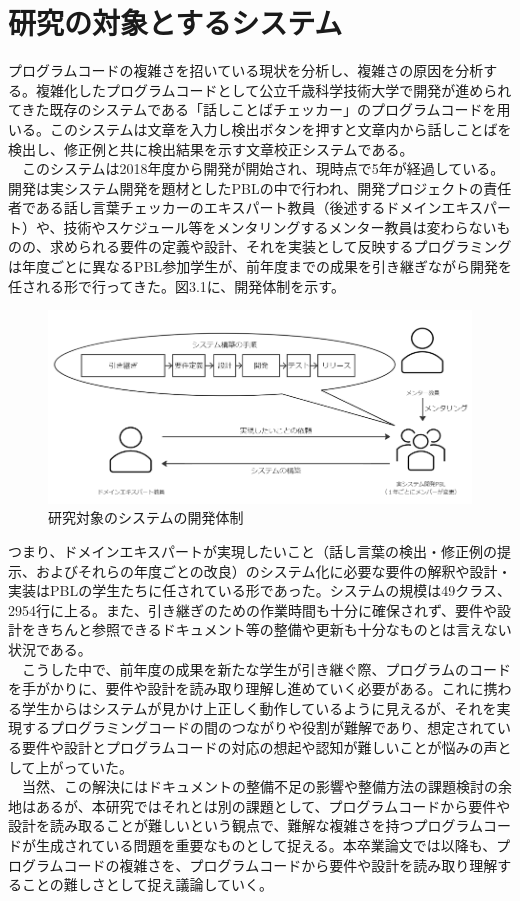 \documentclass[12pt, a4paper]{jreport}
\begin{document}
\section{研究の対象とするシステム}
プログラムコードの複雑さを招いている現状を分析し、複雑さの原因を分析する。複雑化したプログラムコードとして公立千歳科学技術大学で開発が進められてきた既存のシステムである「話しことばチェッカー」のプログラムコードを用いる。このシステムは文章を入力し検出ボタンを押すと文章内から話しことばを検出し、修正例と共に検出結果を示す文章校正システムである。
\\　このシステムは2018年度から開発が開始され、現時点で5年が経過している。開発は実システム開発を題材としたPBLの中で行われ、開発プロジェクトの責任者である話し言葉チェッカーのエキスパート教員（後述するドメインエキスパート）や、技術やスケジュール等をメンタリングするメンター教員は変わらないものの、求められる要件の定義や設計、それを実装として反映するプログラミングは年度ごとに異なるPBL参加学生が、前年度までの成果を引き継ぎながら開発を任される形で行ってきた。図3.1に、開発体制を示す。
\begin{figure}[H]
\centering
\includegraphics[width=1\linewidth]{image/taisyou1.1.png}
\caption{研究対象のシステムの開発体制}
\label{fig:enter-label}
\end{figure}
つまり、ドメインエキスパートが実現したいこと（話し言葉の検出・修正例の提示、およびそれらの年度ごとの改良）のシステム化に必要な要件の解釈や設計・実装はPBLの学生たちに任されている形であった。システムの規模は49クラス、2954行に上る。また、引き継ぎのための作業時間も十分に確保されず、要件や設計をきちんと参照できるドキュメント等の整備や更新も十分なものとは言えない状況である。
\\　こうした中で、前年度の成果を新たな学生が引き継ぐ際、プログラムのコードを手がかりに、要件や設計を読み取り理解し進めていく必要がある。これに携わる学生からはシステムが見かけ上正しく動作しているように見えるが、それを実現するプログラミングコードの間のつながりや役割が難解であり、想定されている要件や設計とプログラムコードの対応の想起や認知が難しいことが悩みの声として上がっていた。
\\　当然、この解決にはドキュメントの整備不足の影響や整備方法の課題検討の余地はあるが、本研究ではそれとは別の課題として、プログラムコードから要件や設計を読み取ることが難しいという観点で、難解な複雑さを持つプログラムコードが生成されている問題を重要なものとして捉える。本卒業論文では以降も、プログラムコードの複雑さを、プログラムコードから要件や設計を読み取り理解することの難しさとして捉え議論していく。
\end{document}
